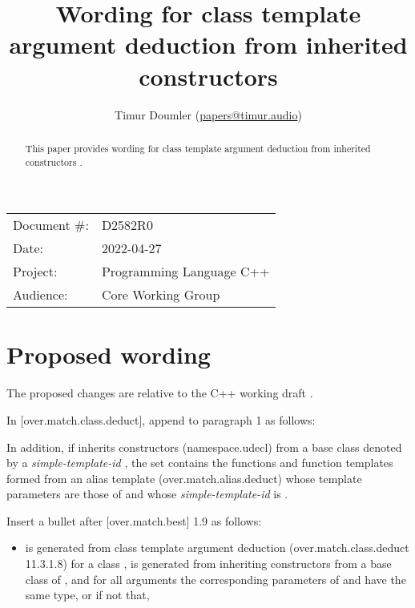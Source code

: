 

\newcommand{\forceindent}{\parindent=1em\indent\parindent=0pt\relax} %



\title{Wording for class template argument deduction from inherited constructors}
\author{
  Timur Doumler \small(\href{mailto:papers@timur.audio}{papers@timur.audio})
}
\date{}
\maketitle

\begin{tabular}{ll}
Document \#: & D2582R0 \\
Date: & 2022-04-27\\
Project: & Programming Language C++ \\
Audience: & Core Working Group
\end{tabular}


\begin{abstract}
This paper provides wording for class template argument deduction from inherited constructors \cite{P1021R5}.
\end{abstract}

\section{Proposed wording}

The proposed changes are relative to the C++ working draft \cite{N4910}. 

In [over.match.class.deduct], append to paragraph 1 as follows:

\begin{adjustwidth}{0.5cm}{0.5cm}
\begin{addedblock}
In addition, if  inherits constructors (namespace.udecl) from a base class denoted by a \emph{simple-template-id} , the set contains the functions and function templates formed from an alias template (over.match.alias.deduct) whose template parameters are those of  and whose \emph{simple-template-id} is .
\end{addedblock}
\end{adjustwidth}

Insert a bullet after [over.match.best] 1.9 as follows:

\begin{adjustwidth}{0.5cm}{0.5cm}
\begin{addedblock}
\begin{itemize}
\item {} is generated from class template argument deduction (over.match.class.deduct 11.3.1.8) for a class ,  is generated from inheriting constructors from a base class of , and for all arguments the corresponding parameters of  and  have the same type, or if not that,
\end{itemize}
\end{addedblock}
\end{adjustwidth}


\renewcommand{\bibname}{References}



